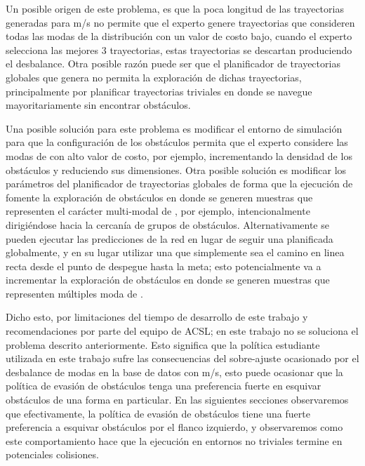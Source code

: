 Un posible origen de este problema, es que la poca longitud de las trayectorias generadas para  m/s no permite que el experto genere trayectorias que consideren todas las modas de la distribución  con un valor de costo bajo, cuando el experto selecciona las mejores 3 trayectorias, estas trayectorias se descartan produciendo el desbalance. Otra posible razón puede ser que el planificador de trayectorias globales que genera  no permita la exploración de dichas trayectorias, principalmente por planificar trayectorias triviales en donde se navegue mayoritariamente sin encontrar obstáculos. 

Una posible solución para este problema es modificar el entorno de simulación para que la configuración de los obstáculos permita que el experto considere las modas de  con alto valor de costo, por ejemplo, incrementando la densidad de los obstáculos y reduciendo sus dimensiones. Otra posible solución es modificar los parámetros del planificador de trayectorias globales de forma que la ejecución de  fomente la exploración de obstáculos en donde se generen muestras que representen el carácter multi-modal de , por ejemplo, intencionalmente dirigiéndose hacia la cercanía de grupos de obstáculos. Alternativamente se pueden ejecutar las predicciones de la red en lugar de seguir una  planificada globalmente, y en su lugar utilizar una  que simplemente sea el camino en linea recta desde el punto de despegue hasta la meta; esto potencialmente va a incrementar la exploración de obstáculos en donde se generen muestras que representen múltiples moda de .

Dicho esto, por limitaciones del tiempo de desarrollo de este trabajo y recomendaciones por parte del equipo de ACSL; en este trabajo no se soluciona el problema descrito anteriormente. Esto significa que la política estudiante utilizada en este trabajo sufre las consecuencias del sobre-ajuste ocasionado por el desbalance de modas en la base de datos con  m/s, esto puede ocasionar que la política de evasión de obstáculos tenga una preferencia fuerte en esquivar obstáculos de una forma en particular. En las siguientes secciones observaremos que efectivamente, la política de evasión de obstáculos tiene una fuerte preferencia a esquivar obstáculos por el flanco izquierdo, y observaremos como este comportamiento hace que la ejecución en entornos no triviales termine en potenciales colisiones.

